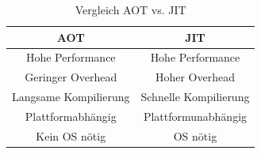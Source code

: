 \begin{table}[ht]
    \begin{center}
        \begin{tabular}{| c | c |}
            \hline
            \textbf{AOT}          & \textbf{JIT}          \\
            \hline
            \hline
            Hohe Performance      & Hohe Performance      \\
            \hline
            Geringer Overhead     & Hoher Overhead        \\
            \hline
            Langsame Kompilierung & Schnelle Kompilierung \\
            \hline
            Plattformabhängig     & Plattformunabhängig     \\
            \hline
            Kein OS nötig         & OS nötig              \\
            \hline
        \end{tabular}
    \end{center}
    \caption{Vergleich AOT vs. JIT}
    \label{vergleich_table}
\end{table}

